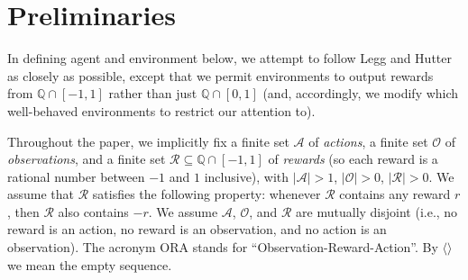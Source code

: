 \documentclass{article}
\begin{document}
\section{Preliminaries}
\label{prelimsecn}

In defining agent and environment below, we attempt to follow
Legg and Hutter \cite{legg2007universal} as closely as possible,
except that we permit environments to output rewards from $\mathbb Q \cap [-1,1]$
rather than just $\mathbb Q\cap [0,1]$ (and, accordingly, we modify which well-behaved
environments to restrict our attention to).

Throughout the paper, we implicitly
fix a finite set $\mathcal A$ of \emph{actions},
a finite set $\mathcal O$ of \emph{observations},
and a finite set $\mathcal R\subseteq \mathbb Q\cap [-1,1]$ of \emph{rewards}
(so each reward is a rational number between $-1$ and $1$ inclusive),
with $|\mathcal A|>1$,
$|\mathcal O|>0$, $|\mathcal R|>0$.
We assume that $\mathcal R$ satisfies the following property:
whenever $\mathcal R$ contains any reward $r$, then $\mathcal R$
also contains $-r$.
We assume $\mathcal A$, $\mathcal O$, and $\mathcal R$ are mutually disjoint
(i.e., no reward is an action, no reward is an observation, and no action is an
observation).
The acronym ORA stands for ``Observation-Reward-Action''.
By $\langle\rangle$ we mean the empty sequence.
\end{document}
